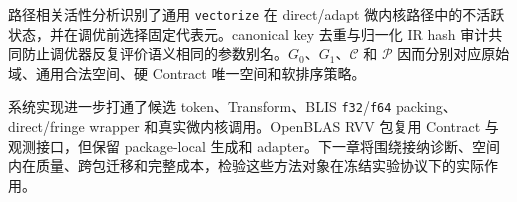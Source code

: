 路径相关活性分析识别了通用 \texttt{vectorize} 在 direct/adapt 微内核路径中的不活跃状态，并在调优前选择固定代表元。canonical key 去重与归一化 IR hash 审计共同防止调优器反复评价语义相同的参数别名。$G_0$、$G_1$、$\mathcal{C}$ 和 $\mathcal{P}$ 因而分别对应原始域、通用合法空间、硬 Contract 唯一空间和软排序策略。

系统实现进一步打通了候选 token、Transform、BLIS \texttt{f32}/\texttt{f64} packing、direct/fringe wrapper 和真实微内核调用。OpenBLAS RVV 包复用 Contract 与观测接口，但保留 package-local 生成和 adapter。下一章将围绕接纳诊断、空间内在质量、跨包迁移和完整成本，检验这些方法对象在冻结实验协议下的实际作用。
